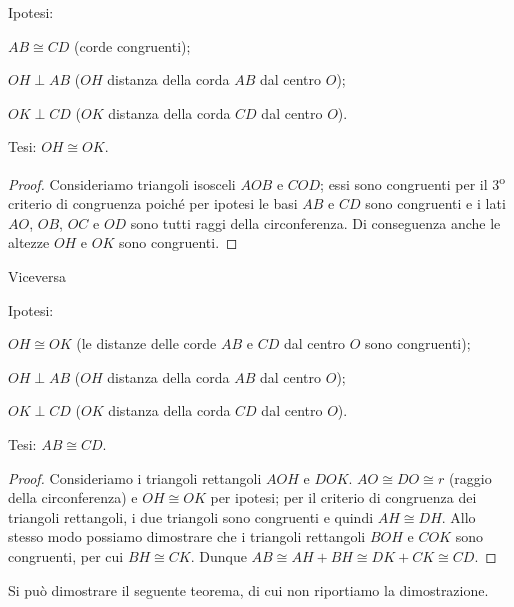 \noindent\begin{minipage}{0.65\textwidth}\parindent15pt
\noindent Ipotesi:
\begin{itemize*}
\item $AB\cong CD$ (corde congruenti);
\item $OH\perp AB$ ($OH$ distanza della corda $AB$ dal centro $O$);
\item $OK\perp CD$ ($OK$ distanza della corda $CD$ dal centro $O$).
\end{itemize*}
\noindent Tesi: $OH\cong OK$.

\begin{proof}
Consideriamo triangoli isosceli $AOB$ e $COD$; essi sono congruenti 
per il 3\textsuperscript{o} criterio di congruenza poiché per ipotesi 
le basi $AB$ e $CD$ sono congruenti e i lati $AO$, $OB$, $OC$ e $OD$ 
sono tutti raggi della circonferenza.
Di conseguenza anche le altezze $OH$ e $OK$ sono congruenti.
\end{proof}
\end{minipage}\hfil
\begin{minipage}{0.35\textwidth}
  \centering
\end{minipage}\vspace{8pt}

\noindent Viceversa\vspace{5pt}

\noindent Ipotesi:
\begin{itemize*}
\item $OH\cong OK$ (le distanze delle corde $AB$ e $CD$ dal centro 
$O$ sono congruenti);
\item $OH\perp AB$ ($OH$ distanza della corda $AB$ dal centro $O$);
\item $OK\perp CD$ ($OK$ distanza della corda $CD$ dal centro $O$).
\end{itemize*}
\noindent Tesi: $AB\cong CD$.

\begin{proof}
Consideriamo i triangoli rettangoli $AOH$ e $DOK$. $AO\cong DO\cong 
r$ (raggio della circonferenza) e $OH\cong OK$ per ipotesi; per il 
criterio di congruenza dei triangoli rettangoli, i due triangoli sono 
congruenti e quindi $AH\cong DH$. Allo stesso modo possiamo 
dimostrare che i triangoli rettangoli $BOH$ e $COK$ sono congruenti, 
per cui $BH\cong CK$. Dunque $AB \cong AH + BH \cong DK + CK \cong 
CD$.
\end{proof}

Si può dimostrare il seguente teorema, di cui non riportiamo la dimostrazione.

